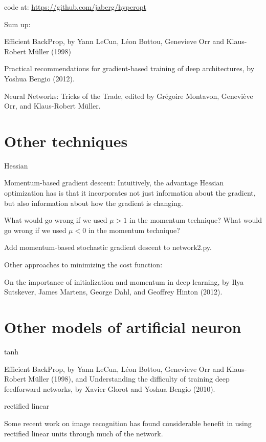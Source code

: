 \documentclass[]{book}
\begin{document}
code at: \url{https://github.com/jaberg/hyperopt}

Sum up:

Efficient BackProp, by Yann LeCun, Léon Bottou, Genevieve Orr and
Klaus-Robert Müller (1998)

Practical recommendations for gradient-based training of deep
architectures, by Yoshua Bengio (2012).

Neural Networks: Tricks of the Trade, edited by Grégoire Montavon,
Geneviève Orr, and Klaus-Robert Müller.

\section{Other techniques}\label{other-techniques}

Hessian

Momentum-based gradient descent: Intuitively, the advantage Hessian
optimization has is that it incorporates not just information about the
gradient, but also information about how the gradient is changing.

What would go wrong if we used \(\mu > 1\) in the momentum technique?
What would go wrong if we used \(\mu < 0\) in the momentum technique?

Add momentum-based stochastic gradient descent to network2.py.

Other approaches to minimizing the cost function:

On the importance of initialization and momentum in deep learning, by
Ilya Sutskever, James Martens, George Dahl, and Geoffrey Hinton (2012).

\section{Other models of artificial
neuron}\label{other-models-of-artificial-neuron}

tanh

Efficient BackProp, by Yann LeCun, Léon Bottou, Genevieve Orr and
Klaus-Robert Müller (1998), and Understanding the difficulty of training
deep feedforward networks, by Xavier Glorot and Yoshua Bengio (2010).

rectified linear

Some recent work on image recognition has found considerable benefit in
using rectified linear units through much of the network.
\end{document}
